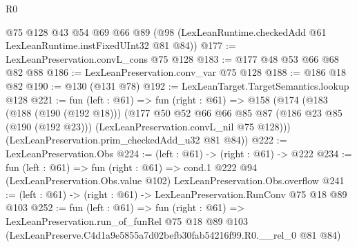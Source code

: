 \begin{lexlean}{R0}
\begin{coremodule}
    @75
    @128
    @43
    @54
    @69
    @66
    @89
    (@98 (LexLeanRuntime.checkedAdd @61 LexLeanRuntime.instFixedUInt32 @81 @84))
@177 := LexLeanPreservation.convL_cons @75 @128
@183 := @177 @48 @53 @66 @68 @82 @88
@186 := LexLeanPreservation.conv_var @75 @128
@188 := @186 @18 @82
@190 := @130 (@131 @78)
@192 := LexLeanTarget.TargetSemantics.lookup @128
@221 := fun (left : @61) =>
  fun (right : @61) =>
  @158
    (@174
      (@183
        (@188 (@190 (@192 @18)))
        (@177
          @50
          @52
          @66
          @66
          @85
          @87
          (@186 @23 @85 (@190 (@192 @23)))
          (LexLeanPreservation.convL_nil @75 @128)))
      (LexLeanPreservation.prim_checkedAdd_u32 @81 @84))
@222 := LexLeanPreservation.Obs
@224 := (left : @61) -> (right : @61) -> @222
@234 := fun (left : @61) =>
  fun (right : @61) =>
  cond.{1} @222 @94 (LexLeanPreservation.Obs.value @102) LexLeanPreservation.Obs.overflow
@241 := (left : @61) -> (right : @61) -> LexLeanPreservation.RunConv @75 @18 @89 @103
@252 := fun (left : @61) =>
  fun (right : @61) =>
  LexLeanPreservation.run_of_funRel
    @75
    @18
    @89
    @103
    (LexLeanPreserve.C4d1a9e5855a7d02befb30fab54216f99.R0.__rel_0 @81 @84)
\end{coremodule}
\end{lexlean}
